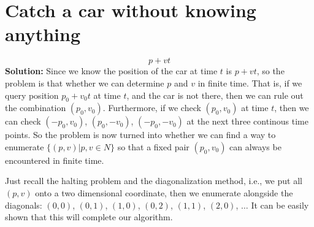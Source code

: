 
\section{Catch a car without knowing anything}
\[
p+vt
\]
{\bf Solution:} Since we know the position of the car at time $t$ is $p+vt$, so the problem is that whether we can determine $p$ and $v$ in finite time. That is, if we query position $p_0+v_0t$ at time $t$, and the car is not there, then we can rule out the combination $(p_0, v_0)$. Furthermore, if we check $(p_0, v_0)$ at time $t$, then we can check $(-p_0, v_0)$, $(p_0, -v_0)$, $(-p_0, -v_0)$ at the next three continous time points. So the problem is now turned into whether we can find a way to enumerate $\{(p,v)|p,v\in N\}$ so that a fixed pair $(p_0,v_0)$ can always be encountered in finite time.

Just recall the halting problem and the diagonalization method, i.e., we put all $(p,v)$ onto a two dimensional coordinate, then we enumerate alongside the diagonals: $(0,0)$, $(0,1)$, $(1,0)$, $(0,2)$, $(1,1)$, $(2,0)$, $\dots$ It can be easily shown that this will complete our algorithm.